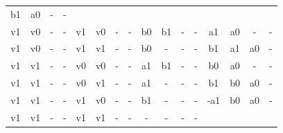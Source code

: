 \begin{table}[H]
{\begin{minipage}{\textwidth}
\begin{tabular}{cccccccccccccccc}
		\multicolumn{1}{c}{b1} &
		\multicolumn{1}{c}{a0} &
		\multicolumn{1}{c}{-}&
		\multicolumn{1}{c}{-} \\
		\multicolumn{1}{c}{v1} & \multicolumn{1}{c}{v0} & \multicolumn{1}{c}{-} & \multicolumn{1}{c}{-} &
		\multicolumn{1}{c}{v1} & \multicolumn{1}{c}{v0} & \multicolumn{1}{c}{-} & \multicolumn{1}{c}{-} &
		\multicolumn{1}{|c}{b0} & \multicolumn{1}{c}{b1} & \multicolumn{1}{c}{-}& \multicolumn{1}{c}{-} &
		\multicolumn{1}{c}{a1} &
		\multicolumn{1}{c}{a0} &
		\multicolumn{1}{c}{-}&
		\multicolumn{1}{c}{-} \\
		\multicolumn{1}{c}{v1} & \multicolumn{1}{c}{v0} & \multicolumn{1}{c}{-} & \multicolumn{1}{c}{-} &
		\multicolumn{1}{c}{v1} & \multicolumn{1}{c}{v1} & \multicolumn{1}{c}{-} & \multicolumn{1}{c}{-} &
		\multicolumn{1}{|c}{b0} & \multicolumn{1}{c}{-} & \multicolumn{1}{c}{-}& \multicolumn{1}{c}{-} &
		\multicolumn{1}{c}{b1} &
		\multicolumn{1}{c}{a1} &
		\multicolumn{1}{c}{a0}&
		\multicolumn{1}{c}{-} \\
		\multicolumn{1}{c}{v1} & \multicolumn{1}{c}{v1} & \multicolumn{1}{c}{-} & \multicolumn{1}{c}{-} &
		\multicolumn{1}{c}{v0} & \multicolumn{1}{c}{v0} & \multicolumn{1}{c}{-} & \multicolumn{1}{c}{-} &
		\multicolumn{1}{|c}{a1} & \multicolumn{1}{c}{b1} & \multicolumn{1}{c}{-}& \multicolumn{1}{c}{-} &
		\multicolumn{1}{c}{b0} &
		\multicolumn{1}{c}{a0} &
		\multicolumn{1}{c}{-}&
		\multicolumn{1}{c}{-} \\
		\multicolumn{1}{c}{v1} & \multicolumn{1}{c}{v1} & \multicolumn{1}{c}{-} & \multicolumn{1}{c}{-} &
		\multicolumn{1}{c}{v0} & \multicolumn{1}{c}{v1} & \multicolumn{1}{c}{-} & \multicolumn{1}{c}{-} &
		\multicolumn{1}{|c}{a1} & \multicolumn{1}{c}{-} & \multicolumn{1}{c}{-}& \multicolumn{1}{c}{-} &
		\multicolumn{1}{c}{b1} &
		\multicolumn{1}{c}{b0} &
		\multicolumn{1}{c}{a0}&
		\multicolumn{1}{c}{-} \\
		\multicolumn{1}{c}{v1} & \multicolumn{1}{c}{v1} & \multicolumn{1}{c}{-} & \multicolumn{1}{c}{-} &
		\multicolumn{1}{c}{v1} & \multicolumn{1}{c}{v0} & \multicolumn{1}{c}{-} & \multicolumn{1}{c}{-} &
		\multicolumn{1}{|c}{b1} & \multicolumn{1}{c}{-} & \multicolumn{1}{c}{-}& \multicolumn{1}{c}{-} &
		\multicolumn{1}{c}{-a1} &
		\multicolumn{1}{c}{b0} &
		\multicolumn{1}{c}{a0}&
		\multicolumn{1}{c}{-} \\
		\multicolumn{1}{c}{v1} & \multicolumn{1}{c}{v1} & \multicolumn{1}{c}{-} & \multicolumn{1}{c}{-} &
		\multicolumn{1}{c}{v1} & \multicolumn{1}{c}{v1} & \multicolumn{1}{c}{-} & \multicolumn{1}{c}{-} &
		\multicolumn{1}{|c}{-} & \multicolumn{1}{c}{-} & \multicolumn{1}{c}{-}& \multicolumn{1}{c}{-} &

\end{tabular}
\end{minipage}}
\end{table}
